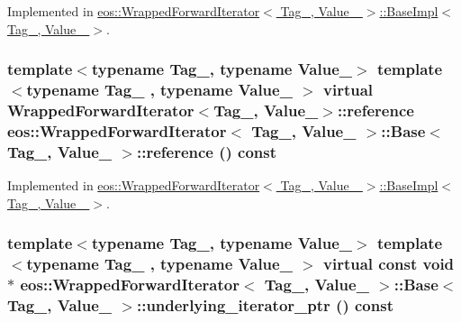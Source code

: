Implemented in \hyperlink{structeos_1_1WrappedForwardIterator_1_1BaseImpl_ad11775ce759f6aa3eff84e67b5e859fd}{eos::WrappedForwardIterator$<$ Tag\_\-, Value\_\- $>$::BaseImpl$<$ Tag\_\-, Value\_\- $>$}.\hypertarget{structeos_1_1WrappedForwardIterator_1_1Base_a1cffbfbcead34d38a7390173496d70df}{
\subsubsection[{reference}]{\setlength{\rightskip}{0pt plus 5cm}template$<$typename Tag\_\-, typename Value\_\-$>$ template$<$typename Tag\_\- , typename Value\_\- $>$ virtual {\bf WrappedForwardIterator}$<$Tag\_\-, Value\_\-$>$::reference {\bf eos::WrappedForwardIterator}$<$ Tag\_\-, Value\_\- $>$::{\bf Base}$<$ Tag\_\-, Value\_\- $>$::reference () const}}
\label{structeos_1_1WrappedForwardIterator_1_1Base_a1cffbfbcead34d38a7390173496d70df}


Implemented in \hyperlink{structeos_1_1WrappedForwardIterator_1_1BaseImpl_a61c99fb9827d32e094355f8c152e65f0}{eos::WrappedForwardIterator$<$ Tag\_\-, Value\_\- $>$::BaseImpl$<$ Tag\_\-, Value\_\- $>$}.\hypertarget{structeos_1_1WrappedForwardIterator_1_1Base_a788fdefd6b028b601e7e56c367a5f864}{
\subsubsection[{underlying\_\-iterator\_\-ptr}]{\setlength{\rightskip}{0pt plus 5cm}template$<$typename Tag\_\-, typename Value\_\-$>$ template$<$typename Tag\_\- , typename Value\_\- $>$ virtual const void$\ast$ {\bf eos::WrappedForwardIterator}$<$ Tag\_\-, Value\_\- $>$::{\bf Base}$<$ Tag\_\-, Value\_\- $>$::underlying\_\-iterator\_\-ptr () const}}
\label{structeos_1_1WrappedForwardIterator_1_1Base_a788fdefd6b028b601e7e56c367a5f864}


